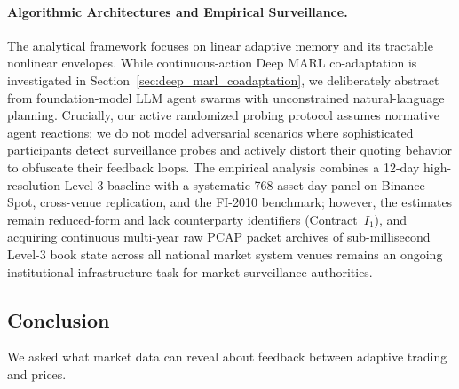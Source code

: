 \documentclass[10pt,twocolumn,letterpaper]{article}
\theoremstyle{definition}
\theoremstyle{remark}
\begin{document}
\paragraph{Algorithmic Architectures and Empirical Surveillance.}
The analytical framework focuses on linear adaptive memory and its tractable nonlinear envelopes. While continuous-action Deep MARL co-adaptation is investigated in Section~\ref{sec:deep_marl_coadaptation}, we deliberately abstract from foundation-model LLM agent swarms with unconstrained natural-language planning. Crucially, our active randomized probing protocol assumes normative agent reactions; we do not model adversarial scenarios where sophisticated participants detect surveillance probes and actively distort their quoting behavior to obfuscate their feedback loops. The empirical analysis combines a 12-day high-resolution Level-3 baseline with a systematic 768 asset-day panel on Binance Spot, cross-venue replication, and the FI-2010 benchmark; however, the estimates remain reduced-form and lack counterparty identifiers (Contract~$I_1$), and acquiring continuous multi-year raw PCAP packet archives of sub-millisecond Level-3 book state across all national market system venues remains an ongoing institutional infrastructure task for market surveillance authorities.
\subsection{Conclusion}
\label{sec:conclusion}

We asked what market data can reveal about feedback between adaptive trading and prices.
\end{document}
